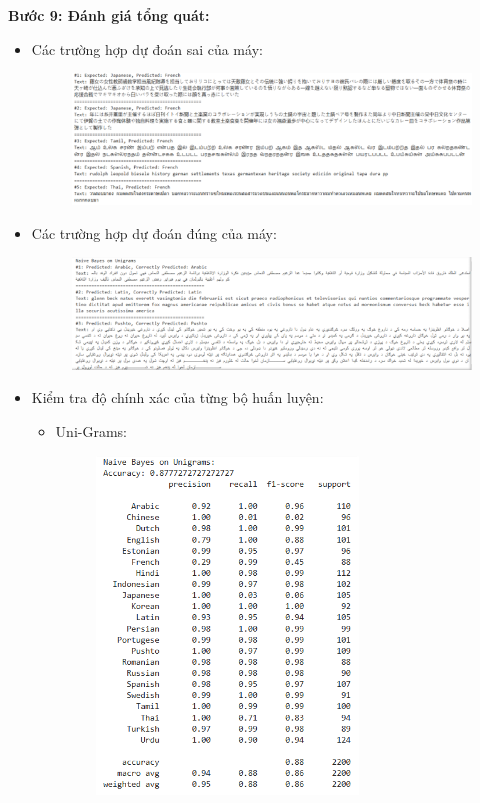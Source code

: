 \textbf{Bước 9: Đánh giá tổng quát:}
\begin{itemize}
    \item Các trường hợp dự đoán sai của máy:
    \begin{figure}[H]
    \centering
    \includegraphics[width=1\textwidth]{img/docspics/Picture40.png}
\end{figure}
    \item Các trường hợp dự đoán đúng của máy:
    \begin{figure}[H]
    \centering
    \includegraphics[width=1\textwidth]{img/docspics/Picture41.png}
\end{figure}
\clearpage
    \item Kiểm tra độ chính xác của từng bộ huấn luyện:
    \begin{itemize}
        \item Uni-Grams:
        \begin{figure}[H]
    \centering
    \includegraphics[width=0.7\textwidth]{img/docspics/Picture42.png}

\end{figure}
\end{itemize}
\end{itemize}
